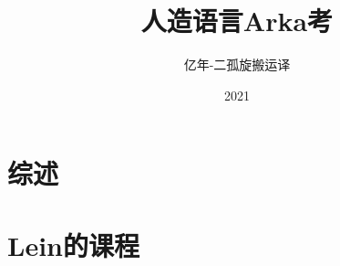 \documentclass[a4paper,12pt]{book}
\title{人造语言Arka考}
\author{亿年-二孤旋\quad 搬运\quad  译 }
\date{2021}
\begin{document}
\maketitle

\frontmatter


%
%
\tableofcontents%
\mainmatter
\part{综述}

\part{Lein的课程}









% 
\appendix

\backmatter
\end{document}
